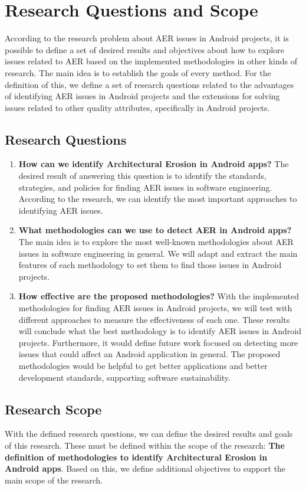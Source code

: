\chapter{Research Questions and Scope}
\label{cha:objectives}

According to the research problem about AER issues in Android projects, it is possible to define a set of desired results and objectives about how to explore issues related to AER based on the implemented methodologies in other kinds of research. The main idea is to establish the goals of every method. For the definition of this, we define a set of research questions related to the advantages of identifying AER issues in Android projects and the extensions for solving issues related to other quality attributes, specifically in Android projects.

\section{Research Questions}

\begin{enumerate}
	\item \textbf{How can we identify Architectural Erosion in Android apps?} The desired result of answering this question is to identify the standards, strategies, and policies for finding AER issues in software engineering. According to the research, we can identify the most important approaches to identifying AER issues.
	\item \textbf{What methodologies can we use to detect AER in Android apps?} The main idea is to explore the most well-known methodologies about AER issues in software engineering in general. We will adapt and extract the main features of each methodology to set them to find those issues in Android projects.
	\item \textbf{How effective are the proposed methodologies?} With the implemented methodologies for finding AER issues in Android projects, we will test with different approaches to measure the effectiveness of each one. These results will conclude what the best methodology is to identify AER issues in Android projects. Furthermore, it would define future work focused on detecting more issues that could affect an Android application in general. The proposed methodologies would be helpful to get better applications and better development standards, supporting software sustainability.
\end{enumerate}

\section{Research Scope}
With the defined research questions, we can define the desired results and goals of this research. These must be defined within the scope of the research: \textbf{The definition of methodologies to identify Architectural Erosion in Android apps}. Based on this, we define additional objectives to support the main scope of the research.

